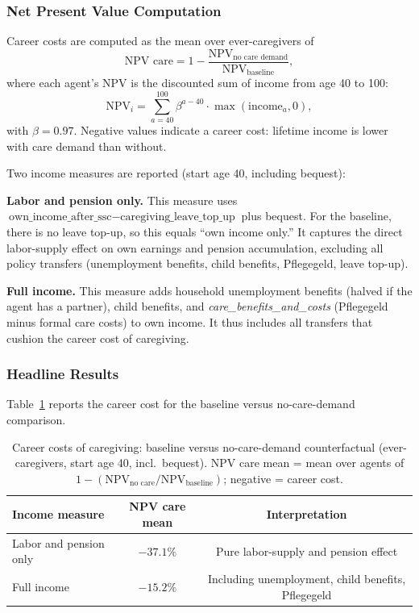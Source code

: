 \subsubsection{Net Present Value Computation}

Career costs are computed as the mean over ever-caregivers of
\begin{equation}
  \text{NPV care} = 1 - \frac{\text{NPV}_{\text{no care demand}}}{\text{NPV}_{\text{baseline}}},
\end{equation}
where each agent's NPV is the discounted sum of income from age 40 to 100:
\begin{equation}
  \text{NPV}_i = \sum_{a=40}^{100} \beta^{a-40} \cdot \max(\text{income}_a, 0),
\end{equation}
with $\beta = 0.97$. Negative values indicate a career cost: lifetime income is lower with care demand than without.

Two income measures are reported (start age 40, including bequest):

\textbf{Labor and pension only.} This measure uses $\text{own\_income\_after\_ssc} - \text{caregiving\_leave\_top\_up}$ plus bequest. For the baseline, there is no leave top-up, so this equals ``own income only.'' It captures the direct labor-supply effect on own earnings and pension accumulation, excluding all policy transfers (unemployment benefits, child benefits, Pflegegeld, leave top-up).

\textbf{Full income.} This measure adds household unemployment benefits (halved if the agent has a partner), child benefits, and \textit{care\_benefits\_and\_costs} (Pflegegeld minus formal care costs) to own income. It thus includes all transfers that cushion the career cost of caregiving.

\subsubsection{Headline Results}

Table~\ref{tab:career_costs_baseline_ncd} reports the career cost for the baseline versus no-care-demand comparison.

\begin{table}[htbp]
  \centering
  \caption{Career costs of caregiving: baseline versus no-care-demand counterfactual (ever-caregivers, start age 40, incl.\ bequest). NPV care mean = mean over agents of $1 - (\text{NPV}_{\text{no care}} / \text{NPV}_{\text{baseline}})$; negative = career cost.}
  \label{tab:career_costs_baseline_ncd}
  \begin{tabular}{lcc}
    \toprule
    Income measure & NPV care mean & Interpretation \\
    \midrule
    Labor and pension only & $-37.1\%$ & Pure labor-supply and pension effect \\
    Full income & $-15.2\%$ & Including unemployment, child benefits, Pflegegeld \\
    \bottomrule
  \end{tabular}
\end{table}

